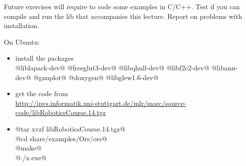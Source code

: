 
Future exercises will require to code some examples in C/C++. Test if you
can compile and run the lib that accompanies this lecture. Report
on problems with installation.

On Ubuntu:
\begin{itemize}
\item install the packages \\ {\small @liblapack-dev@ @freeglut3-dev@
@libqhull-dev@ @libf2c2-dev@ @libann-dev@ @gnuplot@ @doxygen@ @libglew1.6-dev@}
\item get the code
from \\ {\small\url{http://ipvs.informatik.uni-stuttgart.de/mlr/marc/source-code/libRoboticsCourse.14.tgz}}
\item {\small
@tar xvzf libRoboticsCourse.14.tgz@\\
@cd share/examples/Ors/ors@\\
@make@\\
@./x.exe@

}
\end{itemize}




\exerfoot
